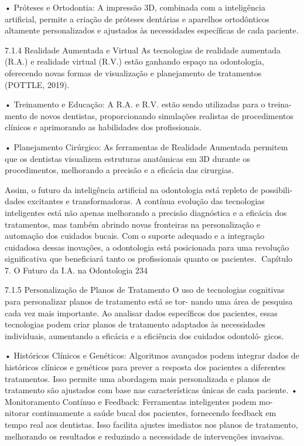     • Próteses e Ortodontia: A impressão 3D, combinada com a inteligência artificial,
      permite a criação de próteses dentárias e aparelhos ortodônticos altamente
      personalizados e ajustados às necessidades específicas de cada paciente.

7.1.4     Realidade Aumentada e Virtual
As tecnologias de realidade aumentada (R.A.) e realidade virtual (R.V.) estão ganhando
espaço na odontologia, oferecendo novas formas de visualização e planejamento de
tratamentos (POTTLE, 2019).

    • Treinamento e Educação: A R.A. e R.V. estão sendo utilizadas para o treina-
      mento de novos dentistas, proporcionando simulações realistas de procedimentos
      clínicos e aprimorando as habilidades dos profissionais.

    • Planejamento Cirúrgico: As ferramentas de Realidade Aumentada permitem que
      os dentistas visualizem estruturas anatômicas em 3D durante os procedimentos,
      melhorando a precisão e a eficácia das cirurgias.

        Assim, o futuro da inteligência artificial na odontologia está repleto de possibili-
dades excitantes e transformadoras. A contínua evolução das tecnologias inteligentes
está não apenas melhorando a precisão diagnóstica e a eficácia dos tratamentos, mas
também abrindo novas fronteiras na personalização e automação dos cuidados bucais.
Com o suporte adequado e a integração cuidadosa dessas inovações, a odontologia
está posicionada para uma revolução significativa que beneficiará tanto os profissionais
quanto os pacientes.
Capítulo 7. O Futuro da I.A. na Odontologia                                           234


7.1.5     Personalização de Planos de Tratamento
O uso de tecnologias cognitivas para personalizar planos de tratamento está se tor-
nando uma área de pesquisa cada vez mais importante. Ao analisar dados específicos
dos pacientes, essas tecnologias podem criar planos de tratamento adaptados às
necessidades individuais, aumentando a eficácia e a eficiência dos cuidados odontoló-
gicos.

    • Históricos Clínicos e Genéticos: Algoritmos avançados podem integrar dados
      de históricos clínicos e genéticos para prever a resposta dos pacientes a diferentes
      tratamentos. Isso permite uma abordagem mais personalizada e planos de
      tratamento são ajustados com base nas características únicas de cada paciente.
    • Monitoramento Contínuo e Feedback: Ferramentas inteligentes podem mo-
      nitorar continuamente a saúde bucal dos pacientes, fornecendo feedback em
      tempo real aos dentistas. Isso facilita ajustes imediatos nos planos de tratamento,
      melhorando os resultados e reduzindo a necessidade de intervenções invasivas.

